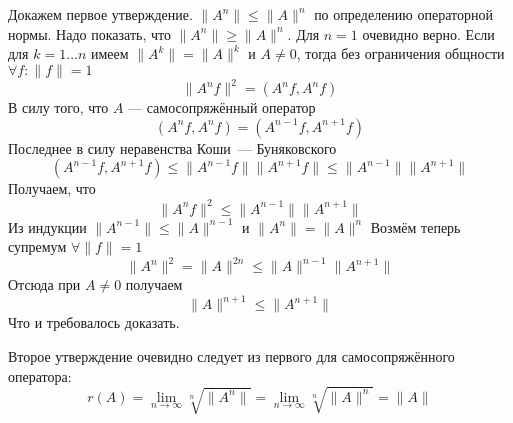 \documentclass[14pt]{extarticle}
\begin{document}
\begin{Proof}
    Докажем первое утверждение.
    $\|A^n\| \le \|A\|^n$ по определению операторной нормы.
    Надо показать, что $\|A^n\| \ge \|A\|^n$.
    Для $n = 1$ очевидно верно.
    Если для $k = 1 \dots n$ имеем $\|A^k\| = \|A\|^k$ и $A \ne 0$, тогда 
    без ограничения общности $\forall f: \|f\| = 1$
    $$
    \|A^n f\|^2 = (A^n f, A^n f)
    $$
    В силу того, что $A$ --- самосопряжённый оператор
    $$
    (A^n f, A^n f) = (A^{n - 1} f, A^{n + 1} f)
    $$
    Последнее в силу неравенства Коши~--- Буняковского
    $$
    (A^{n - 1} f, A^{n + 1} f) \le \|A^{n - 1}f\| \|A^{n + 1} f\| 
    \le \|A^{n - 1}\| \|A^{n + 1}\|
    $$
    Получаем, что
    $$
    \|A^n f\|^2 \le \|A^{n - 1}\| \|A^{n + 1}\|
    $$
    Из индукции $\|A^{n - 1}\| \le \|A\|^{n -1}$ и $\|A^n\| = \|A\|^n$
    Возмём теперь супремум $\forall \|f\| = 1$
    $$
    \|A^n\|^2 = \|A\|^{2n} \le \|A\|^{n - 1} \|A^{n + 1}\|
    $$
    Отсюда при $A \ne 0$ получаем
    $$
    \|A\|^{n + 1} \le \|A^{n + 1}\|
    $$
    Что и требовалось доказать.

    Второе утверждение очевидно следует из первого для самосопряжённого
    оператора:
    $$
    r(A) = \lim_{n \to \infty} \sqrt[n]{\|A^n\|} = \lim_{n \to \infty}
    \sqrt[n]{\|A\|^n} = \|A\|
    $$


\end{Proof}
\end{document}
